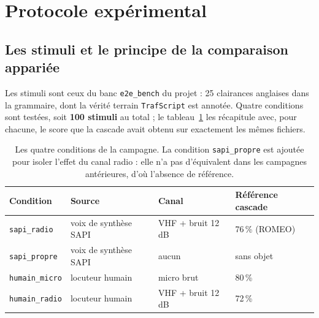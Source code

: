 \documentclass[11pt,a4paper]{article}
\begin{document}
\section{Protocole expérimental}

\subsection{Les stimuli et le principe de la comparaison appariée}

Les stimuli sont ceux du banc \texttt{e2e\_bench} du projet : 25 clairances
anglaises dans la grammaire, dont la vérité terrain \texttt{TrafScript} est
annotée. Quatre conditions sont testées, soit \textbf{100 stimuli} au total ;
le tableau~\ref{tab:conditions} les récapitule avec, pour chacune, le score que
la cascade avait obtenu sur exactement les mêmes fichiers.

\begin{table}[h]
\centering
\caption{Les quatre conditions de la campagne. La condition \texttt{sapi\_propre}
est ajoutée pour isoler l'effet du canal radio : elle n'a pas d'équivalent dans
les campagnes antérieures, d'où l'absence de référence.}
\label{tab:conditions}
\small
\begin{tabular}{@{}llll@{}}
\toprule
\textbf{Condition} & \textbf{Source} & \textbf{Canal} & \textbf{Référence cascade}\\
\midrule
\texttt{sapi\_radio} & voix de synthèse SAPI & VHF + bruit 12\,dB & 76\,\% (ROMEO)\\
\texttt{sapi\_propre} & voix de synthèse SAPI & aucun & sans objet\\
\texttt{humain\_micro} & locuteur humain & micro brut & 80\,\%\\
\texttt{humain\_radio} & locuteur humain & VHF + bruit 12\,dB & 72\,\%\\
\bottomrule
\end{tabular}
\end{table}
\end{document}
